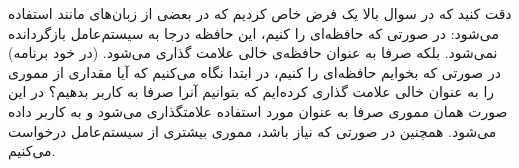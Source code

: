 دقت کنید که در سوال بالا یک فرض خاص کردیم که در بعضی از زبان‌های
مانند
استفاده می‌شود:
در صورتی که حافظه‌ای را
کنیم، این حافظه درجا به سیستم‌عامل بازگردانده نمی‌شود. بلکه صرفا
به عنوان حافظه‌ی خالی علامت گذاری می‌شود. (در خود برنامه) در صورتی که بخوایم حافظه‌ای را
کنیم، در ابتدا نگاه می‌کنیم که آیا مقداری از مموری را به عنوان خالی علامت گذاری کرده‌ایم
که بتوانیم آنرا صرفا به کاربر بدهیم؟ در این صورت همان مموری صرفا به عنوان مورد استفاده
علامتگذاری می‌شود و به کاربر داده می‌شود. همچنین در صورتی که نیاز باشد، مموری بیشتری از
سیستم‌عامل درخواست می‌کنیم.




